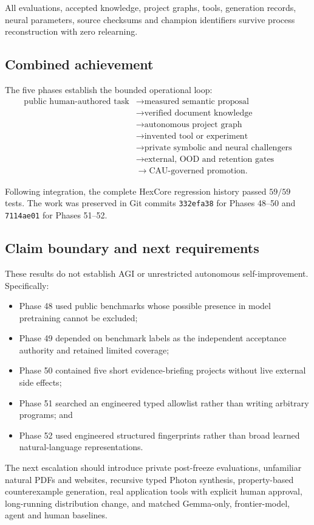 All evaluations, accepted knowledge, project graphs, tools, generation
records, neural parameters, source checksums and champion identifiers survive
process reconstruction with zero relearning.

\subsection{Combined achievement}

The five phases establish the bounded operational loop:
\[
\begin{aligned}
\text{public human-authored task}
&\rightarrow \text{measured semantic proposal}\\
&\rightarrow \text{verified document knowledge}\\
&\rightarrow \text{autonomous project graph}\\
&\rightarrow \text{invented tool or experiment}\\
&\rightarrow \text{private symbolic and neural challengers}\\
&\rightarrow \text{external, OOD and retention gates}\\
&\rightarrow \text{CAU-governed promotion}.
\end{aligned}
\]

Following integration, the complete HexCore regression history passed
\(59/59\) tests.  The work was preserved in Git commits
\texttt{332efa38} for Phases 48--50 and
\texttt{7114ae01} for Phases 51--52.

\subsection{Claim boundary and next requirements}

These results do not establish AGI or unrestricted autonomous
self-improvement.  Specifically:
\begin{itemize}
    \item Phase 48 used public benchmarks whose possible presence in model
    pretraining cannot be excluded;
    \item Phase 49 depended on benchmark labels as the independent acceptance
    authority and retained limited coverage;
    \item Phase 50 contained five short evidence-briefing projects without
    live external side effects;
    \item Phase 51 searched an engineered typed allowlist rather than writing
    arbitrary programs; and
    \item Phase 52 used engineered structured fingerprints rather than broad
    learned natural-language representations.
\end{itemize}

The next escalation should introduce private post-freeze evaluations,
unfamiliar natural PDFs and websites, recursive typed Photon synthesis,
property-based counterexample generation, real application tools with
explicit human approval, long-running distribution change, and matched
Gemma-only, frontier-model, agent and human baselines.

